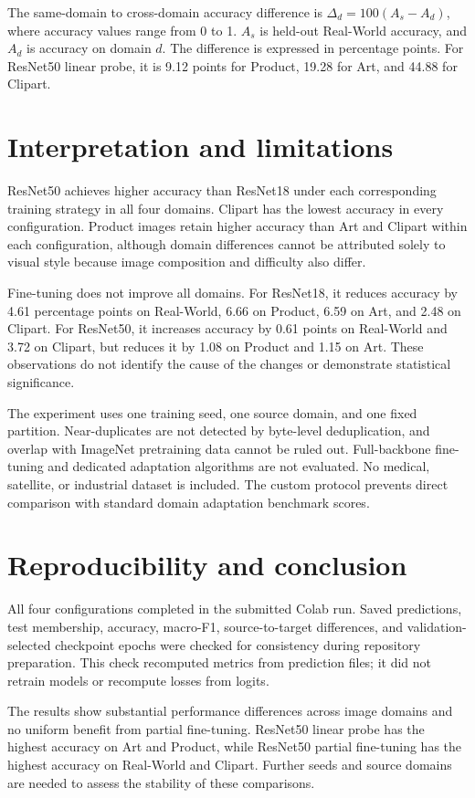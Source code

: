 \documentclass{article}
\begin{document}
The same-domain to cross-domain accuracy difference is $\Delta_d=100(A_s-A_d)$, where accuracy values range from 0 to 1. $A_s$ is held-out Real-World accuracy, and $A_d$ is accuracy on domain $d$. The difference is expressed in percentage points. For ResNet50 linear probe, it is 9.12 points for Product, 19.28 for Art, and 44.88 for Clipart.

\section{Interpretation and limitations}
ResNet50 achieves higher accuracy than ResNet18 under each corresponding training strategy in all four domains. Clipart has the lowest accuracy in every configuration. Product images retain higher accuracy than Art and Clipart within each configuration, although domain differences cannot be attributed solely to visual style because image composition and difficulty also differ.

Fine-tuning does not improve all domains. For ResNet18, it reduces accuracy by 4.61 percentage points on Real-World, 6.66 on Product, 6.59 on Art, and 2.48 on Clipart. For ResNet50, it increases accuracy by 0.61 points on Real-World and 3.72 on Clipart, but reduces it by 1.08 on Product and 1.15 on Art. These observations do not identify the cause of the changes or demonstrate statistical significance.

The experiment uses one training seed, one source domain, and one fixed partition. Near-duplicates are not detected by byte-level deduplication, and overlap with ImageNet pretraining data cannot be ruled out. Full-backbone fine-tuning and dedicated adaptation algorithms are not evaluated. No medical, satellite, or industrial dataset is included. The custom protocol prevents direct comparison with standard domain adaptation benchmark scores.

\section{Reproducibility and conclusion}
All four configurations completed in the submitted Colab run. Saved predictions, test membership, accuracy, macro-F1, source-to-target differences, and validation-selected checkpoint epochs were checked for consistency during repository preparation. This check recomputed metrics from prediction files; it did not retrain models or recompute losses from logits.

The results show substantial performance differences across image domains and no uniform benefit from partial fine-tuning. ResNet50 linear probe has the highest accuracy on Art and Product, while ResNet50 partial fine-tuning has the highest accuracy on Real-World and Clipart. Further seeds and source domains are needed to assess the stability of these comparisons.
\end{document}
